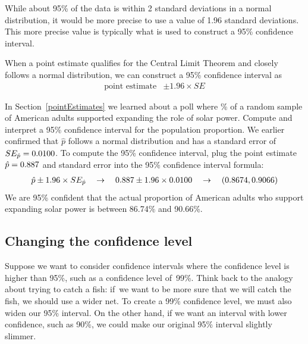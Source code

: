 While about 95\% of the data is within 2 standard deviations
in a normal distribution, it would be more precise to use
a value of 1.96 standard deviations. This more precise value
is typically what is used to construct a
95\% confidence interval.

\begin{termBox}{
  When a point estimate qualifies for the Central Limit
  Theorem and closely follows a normal distribution,
  we can construct a 95\% confidence interval as
  \begin{align*}
  \text{point estimate} &\pm 1.96 \times SE
  \end{align*}
  }
\end{termBox}

\begin{example}{In Section~\ref{pointEstimates} we learned about
    a poll where \pewsolarpollpercent{}\% of a random sample of
    \pewsolarpollsize{} American adults
    supported expanding the role of solar power. Compute and
    interpret a 95\% confidence interval for the population
    proportion.} \label{95p_ci_for_pew_solar_support}
  We earlier confirmed that $\hat{p}$ follows a normal
  distribution and has a standard error of
  $SE_{\hat{p}} = 0.0100{}$.
  To compute the 95\% confidence interval, plug the
  point estimate $\hat{p} = 0.887{}$ and
  standard error into the 95\% confidence interval formula:
  \begin{align*}
  \hat{p} \pm 1.96 \times SE_{\hat{p}}
  \quad\to\quad
  0.887{} \pm 1.96 \times 0.0100{}
  \quad\to\quad
  (0.8674, 0.9066)
  \end{align*}
  We are 95\% confident that the actual proportion of
  American adults who support expanding solar power is
  between 86.74\% and 90.66\%.
\end{example}


\subsection{Changing the confidence level}
\label{changingTheConfidenceLevelSection}


Suppose we want to consider confidence intervals where the confidence
level is higher than 95\%, such as a confidence
level of~99\%. Think back to the analogy about trying to catch a fish:
if~we want to be more sure that we will catch the fish, we should use
a wider net. To create a 99\% confidence level, we must also widen our
95\% interval. On the other hand, if we want an interval with lower
confidence, such as 90\%, we could make our original 95\% interval
slightly slimmer.

